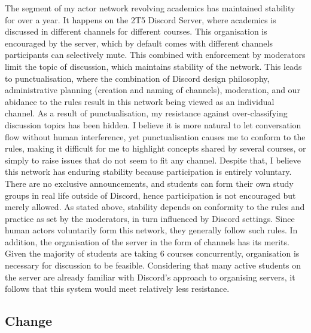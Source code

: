 \documentclass[12pt]{article}
\begin{document}
The segment of my actor network revolving academics has maintained stability for over a year. It happens on the 2T5 Discord Server, where academics is discussed in different channels for different courses. This organisation is encouraged by the server, which by default comes with different channels participants can selectively mute. This combined with enforcement by moderators limit the topic of discussion, which maintains stability of the network. This leads to punctualisation, where the combination of Discord design philosophy, administrative planning (creation and naming of channels), moderation, and our abidance to the rules result in this network being viewed as an individual channel. As a result of punctualisation, my resistance against over-classifying discussion topics has been hidden. I believe it is more natural to let conversation flow without human interference, yet punctualisation causes me to conform to the rules, making it difficult for me to highlight concepts shared by several courses, or simply to raise issues that do not seem to fit any channel. Despite that, I believe this network has enduring stability because participation is entirely voluntary. There are no exclusive announcements, and students can form their own study groups in real life outside of Discord, hence participation is not encouraged but merely allowed. As stated above, stability depends on conformity to the rules and practice as set by the moderators, in turn influenced by Discord settings. Since human actors voluntarily form this network, they generally follow such rules. In addition, the organisation of the server in the form of channels has its merits. Given the majority of students are taking 6 courses concurrently, organisation is necessary for discussion to be feasible. Considering that many active students on the server are already familiar with Discord's approach to organising servers, it follows that this system would meet relatively less resistance.

\subsection{Change}
\end{document}
